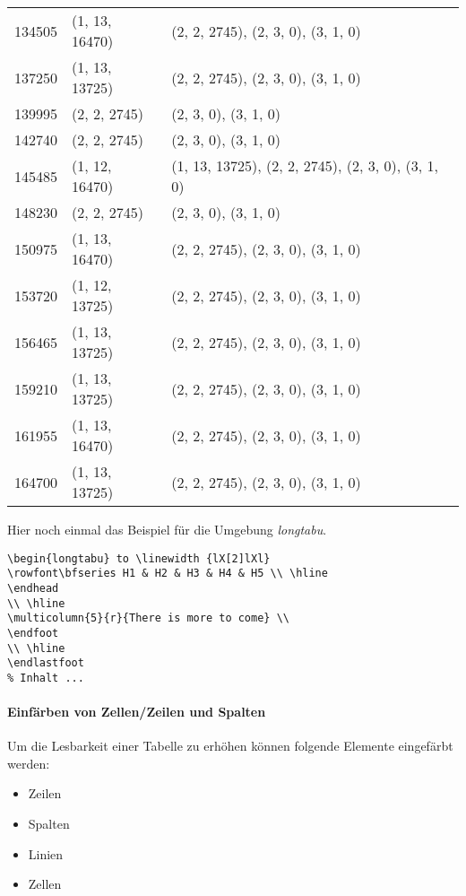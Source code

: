 \begin{center}
\begin{longtable}{|l|l|l|}
		134505 & (1, 13, 16470) & (2, 2, 2745), (2, 3, 0), (3, 1, 0) \\
		137250 & (1, 13, 13725) & (2, 2, 2745), (2, 3, 0), (3, 1, 0) \\
		139995 & (2, 2, 2745) & (2, 3, 0), (3, 1, 0) \\
		142740 & (2, 2, 2745) & (2, 3, 0), (3, 1, 0) \\
		145485 & (1, 12, 16470) & (1, 13, 13725), (2, 2, 2745), (2, 3, 0), (3, 1, 0) \\
		148230 & (2, 2, 2745) & (2, 3, 0), (3, 1, 0) \\
		150975 & (1, 13, 16470) & (2, 2, 2745), (2, 3, 0), (3, 1, 0) \\
		153720 & (1, 12, 13725) & (2, 2, 2745), (2, 3, 0), (3, 1, 0) \\
		156465 & (1, 13, 13725) & (2, 2, 2745), (2, 3, 0), (3, 1, 0) \\
		159210 & (1, 13, 13725) & (2, 2, 2745), (2, 3, 0), (3, 1, 0) \\
		161955 & (1, 13, 16470) & (2, 2, 2745), (2, 3, 0), (3, 1, 0) \\
		164700 & (1, 13, 13725) & (2, 2, 2745), (2, 3, 0), (3, 1, 0) \\
	\end{longtable}
\end{center}

Hier noch einmal das Beispiel für die Umgebung \emph{longtabu}.
\begin{lstlisting}[style=LaTeX]
\begin{longtabu} to \linewidth {lX[2]lXl}
\rowfont\bfseries H1 & H2 & H3 & H4 & H5 \\ \hline 
\endhead
\\ \hline
\multicolumn{5}{r}{There is more to come} \\
\endfoot
\\ \hline
\endlastfoot
% Inhalt ...
\end{lstlisting}


\paragraph{Einfärben von Zellen/Zeilen und Spalten}

Um die Lesbarkeit einer Tabelle zu erhöhen können folgende Elemente eingefärbt werden: 
\begin{itemize}
	\item Zeilen
	\item Spalten
	\item Linien
	\item Zellen
\end{itemize}

